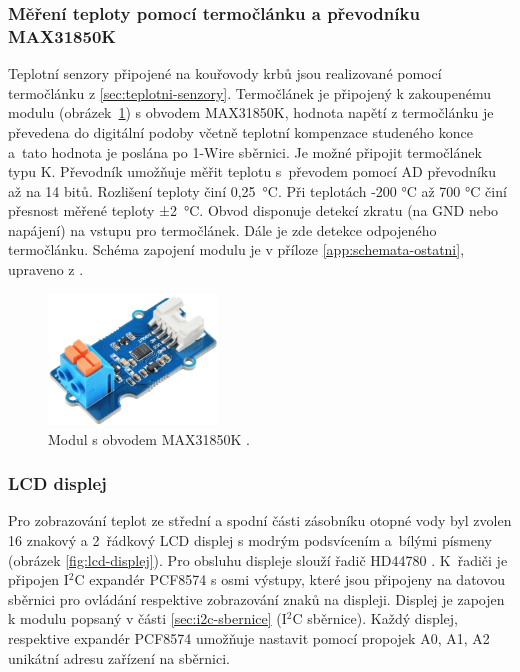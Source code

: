 \subsubsection{Měření teploty pomocí termočlánku a převodníku MAX31850K}
Teplotní senzory připojené na kouřovody krbů jsou realizované pomocí termočlánku z \ref{sec:teplotni-senzory}. Termočlánek je připojený k zakoupenému modulu (obrázek~\ref{fig:modul-max31850k-1-wire-prevodnik-termoclanku}) s obvodem MAX31850K, hodnota napětí z termočlánku je převedena do digitální podoby včetně teplotní kompenzace studeného konce a~tato hodnota je poslána po 1-Wire sběrnici. Je možné připojit termočlánek typu K. Převodník umožňuje měřit teplotu s~převodem pomocí AD převodníku až na 14 bitů. Rozlišení teploty činí 0,25~°C. Při teplotách -200 °C až 700 °C činí přesnost měřené teploty ±2~°C. Obvod disponuje detekcí zkratu (na GND nebo napájení) na vstupu pro termočlánek. Dále je zde detekce odpojeného termočlánku. Schéma zapojení modulu je v příloze \ref{app:schemata-ostatni}, upraveno z \cite{prevodnik-max31850k}.


\begin{figure}[H]
    \centering
    \includegraphics[width=0.4\textwidth]{images/krb/modul-max31850k-1-wire-prevodnik-termoclanku.png}
    \caption[Modul s obvodem MAX31850K.]{Modul s obvodem MAX31850K \cite{prevodnik-max31850k}.}
    \label{fig:modul-max31850k-1-wire-prevodnik-termoclanku}
\end{figure}

\subsubsection{LCD displej}
Pro zobrazování teplot ze střední a spodní části zásobníku otopné vody byl zvolen 16 znakový a 2~řádkový LCD displej s modrým podsvícením a~bílými písmeny (obrázek \ref{fig:lcd-displej}). Pro obsluhu displeje slouží řadič HD44780 \cite{hd44780u}. K~řadiči je připojen I$^2$C expandér PCF8574 \cite{pcf8574} s osmi výstupy, které jsou připojeny na datovou sběrnici pro ovládání respektive zobrazování znaků na displeji. Displej je zapojen k modulu popsaný v části \ref{sec:i2c-sbernice} (I$^2$C sběrnice). Každý displej, respektive expandér PCF8574  umožňuje nastavit pomocí propojek A0, A1, A2 unikátní adresu zařízení na sběrnici.

